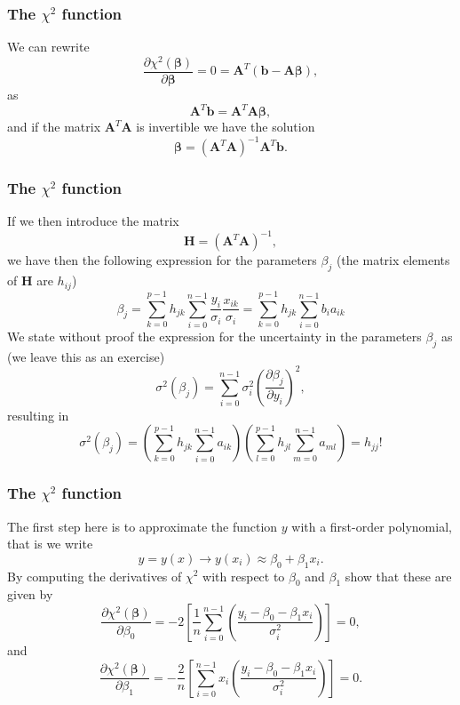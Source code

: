 \documentclass{beamer}
\begin{document}
\begin{frame}
\frametitle{The $\chi^2$ function}

\begin{block}{}

We can rewrite
\[
\frac{\partial \chi^2(\bm{\beta})}{\partial \bm{\beta}} = 0 = \bm{A}^T\left( \bm{b}-\bm{A}\bm{\beta}\right),  
\]
as
\[
\bm{A}^T\bm{b} = \bm{A}^T\bm{A}\bm{\beta},  
\]
and if the matrix $\bm{A}^T\bm{A}$ is invertible we have the solution
\[
\bm{\beta} =\left(\bm{A}^T\bm{A}\right)^{-1}\bm{A}^T\bm{b}.
\]
\end{block}
\end{frame}

\begin{frame}
\frametitle{The $\chi^2$ function}

\begin{block}{}

If we then introduce the matrix
\[
\bm{H} =  \left(\bm{A}^T\bm{A}\right)^{-1},
\]
we have then the following expression for the parameters $\beta_j$ (the matrix elements of $\bm{H}$ are $h_{ij}$)
\[
\beta_j = \sum_{k=0}^{p-1}h_{jk}\sum_{i=0}^{n-1}\frac{y_i}{\sigma_i}\frac{x_{ik}}{\sigma_i} = \sum_{k=0}^{p-1}h_{jk}\sum_{i=0}^{n-1}b_ia_{ik}
\]
We state without proof the expression for the uncertainty  in the parameters $\beta_j$ as (we leave this as an exercise)
\[
\sigma^2(\beta_j) = \sum_{i=0}^{n-1}\sigma_i^2\left( \frac{\partial \beta_j}{\partial y_i}\right)^2, 
\]
resulting in 
\[
\sigma^2(\beta_j) = \left(\sum_{k=0}^{p-1}h_{jk}\sum_{i=0}^{n-1}a_{ik}\right)\left(\sum_{l=0}^{p-1}h_{jl}\sum_{m=0}^{n-1}a_{ml}\right) = h_{jj}!
\]
\end{block}
\end{frame}

\begin{frame}
\frametitle{The $\chi^2$ function}

\begin{block}{}
The first step here is to approximate the function $y$ with a first-order polynomial, that is we write
\[
y=y(x) \rightarrow y(x_i) \approx \beta_0+\beta_1 x_i.
\]
By computing the derivatives of $\chi^2$ with respect to $\beta_0$ and $\beta_1$ show that these are given by
\[
\frac{\partial \chi^2(\bm{\beta})}{\partial \beta_0} = -2\left[ \frac{1}{n}\sum_{i=0}^{n-1}\left(\frac{y_i-\beta_0-\beta_1x_{i}}{\sigma_i^2}\right)\right]=0,
\]
and
\[
\frac{\partial \chi^2(\bm{\beta})}{\partial \beta_1} = -\frac{2}{n}\left[ \sum_{i=0}^{n-1}x_i\left(\frac{y_i-\beta_0-\beta_1x_{i}}{\sigma_i^2}\right)\right]=0.
\]
\end{block}
\end{frame}
\end{document}
